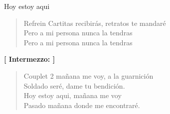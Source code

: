 \begin{song}[huayno]{Hoy estoy aqui}
\begin{verse}{Refrein}
Cartitas recibir\'{a}s, \hspace{5em} retratos te mandar\'{e} \\
Pero a mi persona nunca la tendras\\
Pero a mi persona nunca la tendras\hspace{1.5em}\hspace{1.5em}
\end{verse}
\textbf{[ Intermezzo: ]}\\
\begin{verse}{Couplet 2}
ma\~{n}ana me voy, a la guarnici\'{o}n\\
Soldado ser\'{e}, dame tu bendici\'{o}n.\\
Hoy estoy aqui, ma\~{n}ana me voy\\
Pasado ma\~{n}ana donde me encontrar\'{e}.\hspace{4em}\hspace{4em}\\
\end{verse}

\end{song}
